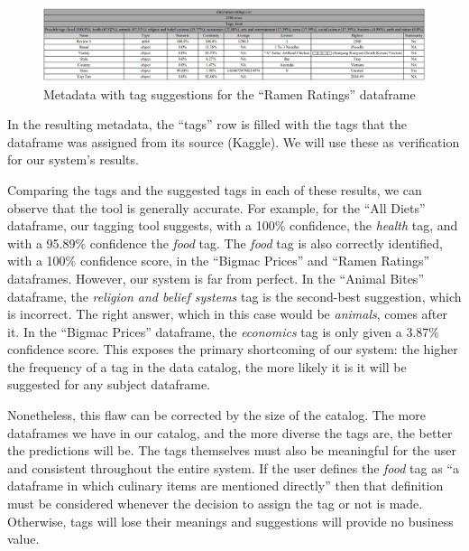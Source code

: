\begin{figure}[h]
    \centering
    \includegraphics[width=12cm]{figures/tag_suggestions/ramen_ratings_tags}
    \caption{Metadata with tag suggestions for the ``Ramen Ratings'' dataframe}
    \label{fig:ramen_ratings_tags}
\end{figure}

In the resulting metadata, the ``tags'' row is filled with the tags that the dataframe was assigned from its source (Kaggle).
We will use these as verification for our system's results.

Comparing the tags and the suggested tags in each of these results, we can observe that the tool is generally accurate.
For example, for the ``All Diets'' dataframe, our tagging tool suggests, with a 100\% confidence, the \textit{health} tag,
and with a 95.89\% confidence the \textit{food} tag.
The \textit{food} tag is also correctly identified, with a 100\% confidence score, in the ``Bigmac Prices'' and ``Ramen Ratings''
dataframes.
However, our system is far from perfect.
In the ``Animal Bites'' dataframe, the \textit{religion and belief systems} tag is the second-best suggestion, which is incorrect.
The right answer, which in this case would be \textit{animals}, comes after it.
In the ``Bigmac Prices'' dataframe, the \textit{economics} tag is only given a 3.87\% confidence score.
This exposes the primary shortcoming of our system: the higher the frequency of a tag in the data catalog, the more likely
it is it will be suggested for any subject dataframe.

Nonetheless, this flaw can be corrected by the size of the catalog.
The more dataframes we have in our catalog, and the more diverse the tags are, the better the predictions will be.
The tags themselves must also be meaningful for the user and consistent throughout the entire system.
If the user defines the \textit{food} tag as ``a dataframe in which culinary items are mentioned directly'' then that definition
must be considered whenever the decision to assign the tag or not is made.
Otherwise, tags will lose their meanings and suggestions will provide no business value.